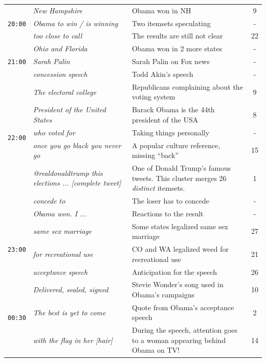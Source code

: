 \documentclass{sig-alternate}
\begin{document}
\begin{table}
\begin{center}
\begin{tabular}{|p{0.7cm}|p{2.5cm}|p{4cm}|c|}
\multirow{3}{*}{\texttt{20:00}}
& \em New Hampshire &  Obama won in NH & 9 \\ \cline{2 - 4}
& \em Obama to win / is winning & Two itemsets speculating  & - \\ \cline{2-4}
& \em too close to call & The results are still not clear & 22 \\ \hline


\multirow{3}{*}{\texttt{21:00}}
& \em Ohio and Florida &  Obama won in 2 more states & - \\ \cline{2 - 4}
& \em Sarah Palin & Sarah Palin  on Fox news  & - \\ \cline{2-4} %
& \em concession speech & Todd Akin's  speech & - \\ \hline


\multirow{5}{*}{\texttt{22:00}} 
& \em The electoral college &  Republicans complaining about the voting system  & 9 \\ \cline{2 - 4}
& \em President of the United States & Barack Obama is the 44th president of the USA   & 8 \\ \cline{2-4} %
& \em who voted for & Taking things personally & - \\ \cline{2-4} %
& \em once you go black you never go & A popular culture reference, missing ``back''& 15 \\ 
 \hline %

\multirow{3}{*}{\texttt{22:30} }
& \em @realdonaldtrump this elections ... [complete tweet]	& One of Donald Trump's famous tweets. This cluster merges 26 \emph{distinct} itemsets. & 1  \\ \cline{2-4}
& \em concede to & The loser has to concede  & - \\ \cline{2-4} %
& \em Obama won. I ... & Reactions to the result & - \\ \hline %

\multirow{3}{*}{\texttt{23:00} }
& \em same sex marriage	& Some states legalized same sex marriage & 27  \\ \cline{2-4}
& \em for recreational use & CO and WA legalized weed for recreational use   & 21 \\ \cline{2-4} %
& \em acceptance speech & Anticipation for the speech & 26 \\ \hline %

\multirow{3}{*}{\texttt{00:30} }
& \em Delivered, sealed, signed & Stevie Wonder's song used in Obama's campaigns & 10  \\ \cline{2-4}
& \em The best is yet to come & Quote from Obama's acceptance speech  & 2 \\ \cline{2-4} %
& \em with the flag in her [hair]	&  During the speech, attention goes to a woman appearing behind Obama on TV! & 14 \\ \hline %
						

\end{tabular}
\end{center}
\end{table}
\end{document}
